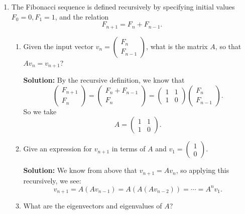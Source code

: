 \documentclass[11pt]{article}
\begin{document}
\begin{enumerate}

\item The Fibonacci sequence is defined recursively by specifying initial values $F_0 = 0, F_1 = 1$, and the relation
\[ F_{n+1} = F_n + F_{n-1}. \]
\begin{enumerate}
\item Given the input vector $v_{n} = \begin{pmatrix} F_{n} \\ F_{n-1} \end{pmatrix}$, what is the matrix $A$, so that $Av_n = v_{n+1}$?

\textbf{Solution:} By the recursive definition, we know that
\[\begin{pmatrix} F_{n+1} \\ F_n \end{pmatrix} = \begin{pmatrix} F_{n} + F_{n-1} \\ F_n \end{pmatrix} = \begin{pmatrix} 1 & 1 \\ 1 & 0 \end{pmatrix} \begin{pmatrix} F_n\\ F_{n-1} \end{pmatrix}. \] 
So we take
\[A = \begin{pmatrix} 1 & 1 \\ 1 & 0 \end{pmatrix} .\]

\item Give an expression for $v_{n+1}$ in terms of $A$ and $v_1 = \begin{pmatrix} 1 \\ 0 \end{pmatrix}$.

\textbf{Solution:} We know from above that $v_{n+1} = A v_{n}$, so applying this recursively, we see:
\[ v_{n+1} = A(Av_{n-1}) = A(A(Av_{n-2})) = \cdots = A^{n} v_1.\]

\item What are the eigenvectors and eigenvalues of $A$?


\end{enumerate}
\end{enumerate}
\end{document}
